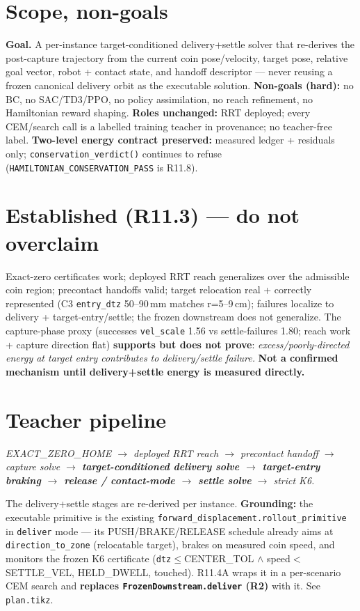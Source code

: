 \documentclass[11pt]{article}
\newcommand{\code}[1]{\texttt{\small #1}}
\newcommand{\gate}[1]{\textcolor{blue!55!black}{\texttt{\small #1}}}
\begin{document}
\section{Scope, non-goals}
\textbf{Goal.} A per-instance target-conditioned delivery+settle solver that re-derives the post-capture trajectory from
the current coin pose/velocity, target pose, relative goal vector, robot + contact state, and handoff descriptor --- never
reusing a frozen canonical delivery orbit as the executable solution. \textbf{Non-goals (hard):} no BC, no SAC/TD3/PPO, no
policy assimilation, no reach refinement, no Hamiltonian reward shaping. \textbf{Roles unchanged:} RRT deployed; every
CEM/search call is a labelled training teacher in provenance; no teacher-free label. \textbf{Two-level energy contract
preserved:} measured ledger + residuals only; \code{conservation\_verdict()} continues to refuse
(\gate{HAMILTONIAN\_CONSERVATION\_PASS} is R11.8).

\section{Established (R11.3) --- do not overclaim}
Exact-zero certificates work; deployed RRT reach generalizes over the admissible coin region; precontact handoffs valid;
target relocation real + correctly represented (C3 \code{entry\_dtz} 50--90\,mm matches r=5--9\,cm); failures localize to
delivery + target-entry/settle; the frozen downstream does not generalize. The capture-phase proxy (successes
\code{vel\_scale} 1.56 vs settle-failures 1.80; reach work + capture direction flat) \textbf{supports but does not prove}:
\emph{excess/poorly-directed energy at target entry contributes to delivery/settle failure.} \textbf{Not a confirmed
mechanism until delivery+settle energy is measured directly.}

\section{Teacher pipeline}
\begin{center}\itshape EXACT\_ZERO\_HOME $\to$ deployed RRT reach $\to$ precontact handoff $\to$ capture solve $\to$
\textbf{target-conditioned delivery solve $\to$ target-entry braking $\to$ release / contact-mode $\to$ settle solve}
$\to$ strict K6.\end{center}
The delivery+settle stages are re-derived per instance. \textbf{Grounding:} the executable primitive is the existing
\code{forward\_displacement.rollout\_primitive} in \code{deliver} mode --- its PUSH/BRAKE/RELEASE schedule already aims at
\code{direction\_to\_zone} (relocatable target), brakes on measured coin speed, and monitors the frozen K6 certificate
(\code{dtz}$\le$CENTER\_TOL $\wedge$ speed$<$SETTLE\_VEL, HELD\_DWELL, touched). R11.4A wraps it in a per-scenario CEM
search and \textbf{replaces \code{FrozenDownstream.deliver} (R2)} with it. See \code{plan.tikz}.
\end{document}
